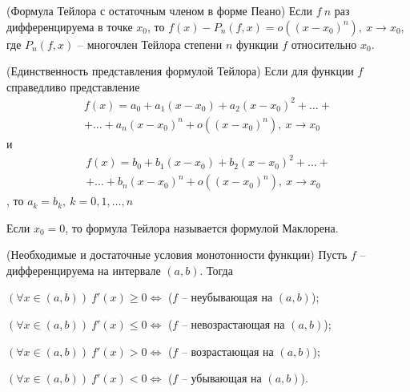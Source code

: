 \begin{multicols}{2}
\begin{theorema}{(Формула Тейлора с остаточным членом в форме Пеано)}{}
         Если $f\ n$ раз дифференцируема в точке $x_0$, то $f(x) - P_n(f,x) = o((x-x_0)^n),\ x\to x_0$, где $P_n(f,x)$ -- многочлен Тейлора степени $n$ функции $f$ относительно $x_0$.
    \end{theorema}
    \begin{theorema}{(Единственность представления формулой Тейлора)}{}
         Если для функции $f$ справедливо представление \[
            \begin{array}{c}
                f(x) = a_0 + a_1(x-x_0) + a_2(x-x_0)^2 + \ldots + \\ + \ldots + a_n(x-x_0)^n + o((x-x_0)^n),\ x \to x_0                
            \end{array}
        \] и \[
            \begin{array}{c}
                f(x) = b_0 + b_1(x-x_0) + b_2(x-x_0)^2 + \ldots + \\ + \ldots + b_n(x-x_0)^n + o((x-x_0)^n), \ x\to x_0                
            \end{array}
    \], то $a_k = b_k,\ k = 0,1,\ldots, n$
    \end{theorema}
    Если $x_0 = 0$, то формула Тейлора называется формулой Маклорена.
    \begin{theorema}{(Необходимые и достаточные условия монотонности функции)}{}
         Пусть $f$ -- дифференцируема на интервале $(a,b)$. Тогда \begin{enumerate*}
            \item $(\forall x \in (a,b))\ f'(x) \geq 0 \Leftrightarrow$ ($f$ -- неубывающая на $(a,b)$);
            \item $(\forall x \in (a,b))\ f'(x) \leq 0 \Leftrightarrow$ ($f$ -- невозрастающая на $(a,b)$);
            \item $(\forall x \in (a,b))\ f'(x) > 0 \Leftrightarrow$ ($f$ -- возрастающая на $(a,b)$);
            \item $(\forall x \in (a,b))\ f'(x) < 0 \Leftrightarrow$ ($f$ -- убывающая на $(a,b)$). 
    \end{enumerate*}
    \end{theorema}


\end{multicols}
